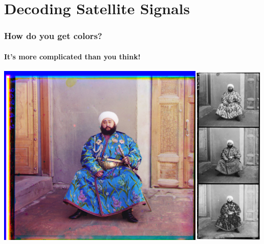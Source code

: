 \documentclass[]{beamer}
\begin{document}
\section[Decoding]{Decoding Satellite Signals}
\frame{\sectionpage}
\begin{frame}
    \frametitle{How do you get colors?}
    \framesubtitle{It's more complicated than you think!}
    \begin{center}
        \includegraphics[width=0.80\paperwidth]{images/rgb-compose.jpg}
    \end{center}
\end{frame}
\end{document}
